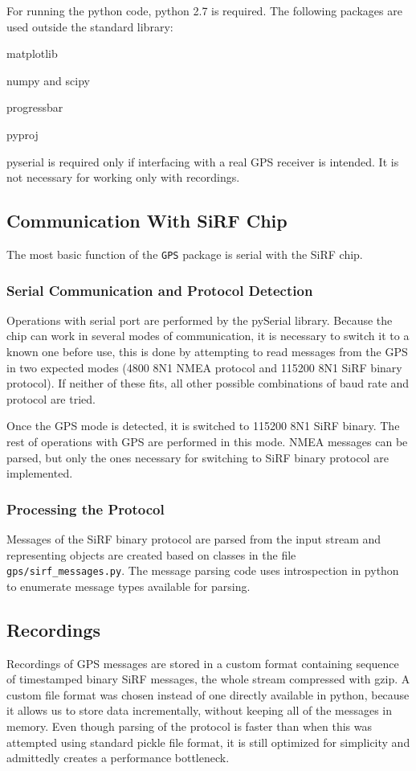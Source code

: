 For running the python code, python 2.7 is required.
The following packages are used outside the standard library:
\begin{compactitem}
\item matplotlib
\item numpy and scipy
\item progressbar
\item pyproj
\item pyserial is required only if interfacing with a real
    GPS receiver is intended. It is not necessary for working only with recordings.
\end{compactitem}

\subsection{Communication With SiRF Chip}
The most basic function of the \verb=GPS= package is serial with the
SiRF chip.

\subsubsection{Serial Communication and Protocol Detection}
Operations with serial port are performed by the pySerial library.
Because the chip can work in several modes of communication, it is necessary to
switch it to a known one before use, this is done by attempting to read messages
from the GPS in two expected modes (4800 8N1 NMEA protocol and 115200 8N1 SiRF
binary protocol). If neither of these fits, all other possible
combinations of baud rate and protocol are tried.

Once the GPS mode is detected, it is switched to 115200 8N1 SiRF binary.
The rest of operations with GPS are performed in this mode.
NMEA messages can be parsed, but only the ones necessary for switching to
SiRF binary protocol are implemented.

\subsubsection{Processing the Protocol}
Messages of the SiRF binary protocol are parsed from the input stream and
representing objects are created based on classes in the file \verb=gps/sirf_messages.py=.
The message parsing code uses introspection in python to enumerate message types
available for parsing.

\subsection{Recordings}
\label{sec:impl-recordings}
Recordings of GPS messages are stored in a custom format containing sequence
of timestamped binary SiRF messages, the whole stream compressed with gzip.
A custom file format was chosen instead of one directly available in python,
because it allows us to store data incrementally, without keeping all of the
messages in memory.
Even though parsing of the protocol is faster than when this was attempted
using standard pickle file format, it is still optimized for simplicity
and admittedly creates a performance bottleneck.

